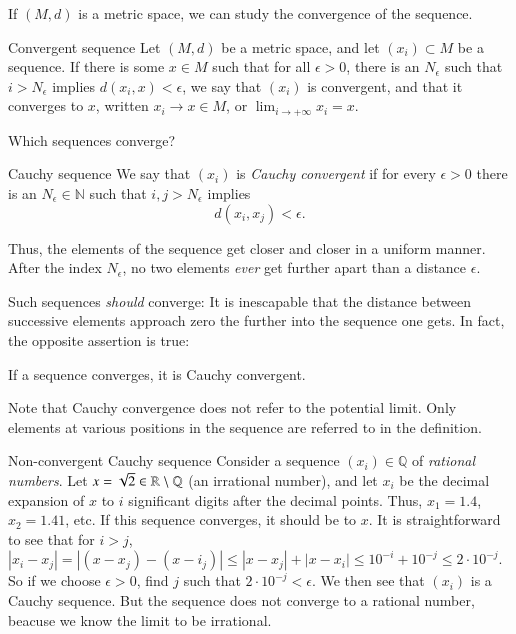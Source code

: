 If $(M,d)$ is a metric space, we can study the convergence of the sequence.
\begin{myDefinition}{Convergent sequence}{}
Let $(M,d)$ be a metric space, and let
$(x_i) \subset M$ be a sequence. If there is some $x \in M$ such that for all $\epsilon > 0$, there is an $N_\epsilon$ such that $i > N_\epsilon$ implies $d(x_i,x) < \epsilon$, we say that $(x_i)$ is convergent, and that it converges to $x$, written $x_i \to x\in M$, or $\lim_{i\to+\infty} x_i = x$.
\end{myDefinition}


Which sequences converge?
\begin{myDefinition}{Cauchy sequence}{}
We say that $(x_i)$ is \emph{Cauchy convergent} if for every $\epsilon > 0$ there is an $N_\epsilon \in \mathbb{N}$ such that $i,j > N_\epsilon$ implies
\begin{equation}
    d(x_i,x_j) < \epsilon.
\end{equation}
\end{myDefinition}
Thus, the elements of the sequence get closer and closer in a uniform manner. After the index $N_\epsilon$, no two elements \emph{ever} get further apart than a distance $\epsilon$.

Such sequences \emph{should} converge: It is inescapable that the distance between successive elements approach zero the further into the sequence one gets. In fact, the opposite assertion is true:
\begin{myTheorem}{}{}
    If a sequence converges, it is Cauchy convergent.
\end{myTheorem}

Note that Cauchy convergence does not refer to the potential limit. Only elements at various positions in the sequence are referred to in the definition.

\begin{myExample}{Non-convergent Cauchy sequence}{}
Consider a sequence $(x_i) \in \mathbb{Q}$ of \emph{rational numbers}. Let $x = \sqrt{2} \in \mathbb{R} \setminus \mathbb{Q}$ (an irrational number), and let $x_i$ be the decimal expansion of $x$ to $i$ significant digits after the decimal points. Thus, $x_1 = 1.4$, $x_2 = 1.41$, etc. If this sequence converges, it should be to $x$. It is straightforward to see that for $i>j$, $|x_i-x_j| = |(x-x_j) - (x - i_j)| \leq |x-x_j| + |x - x_i| \leq 10^{-i} + 10^{-j} \leq 2\cdot 10^{-j}$. So if we choose $\epsilon > 0$, find $j$ such that $2\cdot 10^{-j} < \epsilon$. We then see that $(x_i)$ is a Cauchy sequence.
But the sequence does not converge to a rational number, beacuse we know the limit to be irrational.
\end{myExample}

